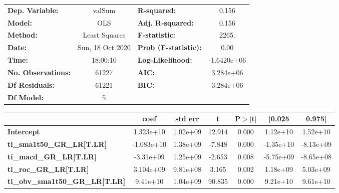 \begin{center}
\begin{tabular}{lclc}
\toprule
\textbf{Dep. Variable:}                 &      valSum      & \textbf{  R-squared:         } &      0.156   \\
\textbf{Model:}                         &       OLS        & \textbf{  Adj. R-squared:    } &      0.156   \\
\textbf{Method:}                        &  Least Squares   & \textbf{  F-statistic:       } &      2265.   \\
\textbf{Date:}                          & Sun, 18 Oct 2020 & \textbf{  Prob (F-statistic):} &      0.00    \\
\textbf{Time:}                          &     18:00:10     & \textbf{  Log-Likelihood:    } & -1.6420e+06  \\
\textbf{No. Observations:}              &       61227      & \textbf{  AIC:               } &  3.284e+06   \\
\textbf{Df Residuals:}                  &       61221      & \textbf{  BIC:               } &  3.284e+06   \\
\textbf{Df Model:}                      &           5      & \textbf{                     } &              \\
\bottomrule
\end{tabular}
\begin{tabular}{lcccccc}
                                        & \textbf{coef} & \textbf{std err} & \textbf{t} & \textbf{P$> |$t$|$} & \textbf{[0.025} & \textbf{0.975]}  \\
\midrule
\textbf{Intercept}                      &    1.323e+10  &     1.02e+09     &    12.914  &         0.000        &     1.12e+10    &     1.52e+10     \\
\textbf{ti\_sma1t50\_GR\_LR[T.LR]}      &   -1.083e+10  &     1.38e+09     &    -7.848  &         0.000        &    -1.35e+10    &    -8.13e+09     \\
\textbf{ti\_macd\_GR\_LR[T.LR]}         &    -3.31e+09  &     1.25e+09     &    -2.653  &         0.008        &    -5.75e+09    &    -8.65e+08     \\
\textbf{ti\_roc\_GR\_LR[T.LR]}          &    3.104e+09  &     9.81e+08     &     3.165  &         0.002        &     1.18e+09    &     5.03e+09     \\
\textbf{ti\_obv\_sma1t50\_GR\_LR[T.LR]} &     9.41e+10  &     1.04e+09     &    90.835  &         0.000        &     9.21e+10    &     9.61e+10     \\

\end{tabular}
\end{center}
